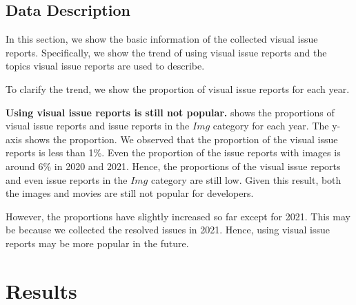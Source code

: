 







\subsection{Data Description}
In this section, we show the basic information of 
the collected visual issue reports.  
Specifically, we show the trend of using 
visual issue reports and 
the topics visual issue reports are used to describe.

To clarify the trend, we show the proportion of 
visual issue reports for each year. 

\textbf{Using visual issue reports is still not popular.} 
 shows the proportions of 
visual issue reports and issue reports in the $Img$ category 
for each year. 
The y-axis shows the proportion. 
We observed that the proportion of the visual issue reports is 
less than 1\%. 
Even the proportion of the issue reports with images is around 6\% 
in 2020 and 2021. 
Hence, the proportions of the visual issue reports and 
even issue reports in the $Img$ category are still low. 
Given this result, both the images and movies are still not 
popular for developers. 

However, the proportions have slightly increased so far 
except for 2021. 
This may be because we collected the resolved issues 
in 2021. 
Hence, using visual issue reports may be more popular in the future. 

\section{Results}
\label{sec:results}

% 

